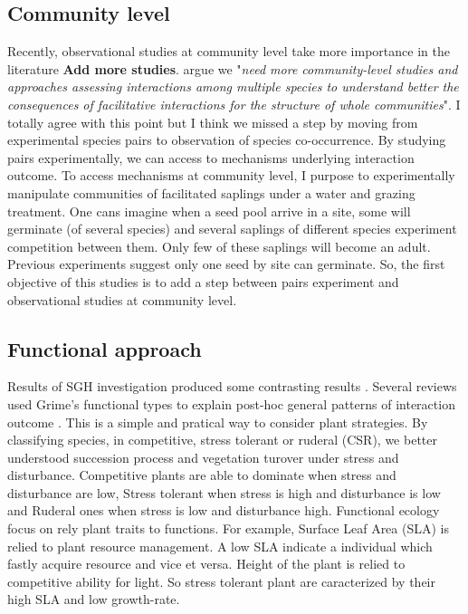 \documentclass[12pt]{article} %
\begin{document}
\subsection{Community level}
Recently, observational studies at community level take more importance in the literature \citep{Soliveres2012, Gross2013, Soliveres2014b} \textbf{Add more studies}. 
\citet{Soliveres2014} argue we "\textit{need more community-level studies and approaches assessing interactions among multiple species to understand better the consequences of facilitative interactions for the structure of whole communities}". 
I totally agree with this point but I think we missed a step by moving from experimental species pairs to observation of species co-occurrence. By studying pairs experimentally, we can access to mechanisms underlying interaction outcome. 
To access mechanisms at community level, I purpose to experimentally manipulate communities of facilitated saplings under a water and grazing treatment.
One cans imagine when a seed pool arrive in a site, some will germinate (of several species) and several saplings of different species experiment competition between them. Only few of these saplings will become an adult. Previous experiments suggest only one seed by site can germinate. So, the first objective of this studies is to add a step between pairs experiment and observational studies at community level.

\subsection{Functional approach}
Results of SGH investigation produced some contrasting results \citep{Maestre2009}. Several reviews used Grime's functional types to explain post-hoc general patterns of interaction outcome \citep{Maestre2009,Butterfield2013}. %
This is a simple and pratical way to consider plant strategies. By classifying species, in competitive, stress tolerant or ruderal (CSR), we better understood succession process and vegetation turover under stress and disturbance. Competitive plants are able to dominate when stress and disturbance are low, Stress tolerant when stress is high and disturbance is low and Ruderal ones when stress is low and disturbance high.%
Functional ecology focus on rely plant traits to functions. For example, Surface Leaf Area (SLA) is relied to plant resource management. A low SLA indicate a individual which fastly acquire resource and vice et versa. Height of the plant is relied to competitive ability for light. So stress tolerant plant are caracterized by their high SLA and low growth-rate.
\end{document}
